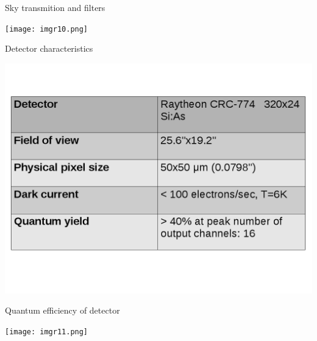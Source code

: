 \documentclass{beamer}
\begin{document}
\begin{frame}{Sky transmition and filters}
\begin{center}
\texttt{[image: imgr10.png]}
\end{center}
\end{frame}


\begin{frame}{Detector characteristics}
\begin{center}
\includegraphics[scale=0.35]{imgr7.png}
\end{center}
\end{frame}

\begin{frame}{Quantum efficiency of detector}
\begin{center}
\texttt{[image: imgr11.png]}
\end{center}
\end{frame}
\end{document}
